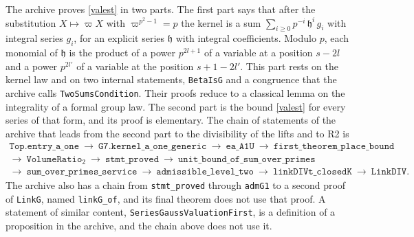 \documentclass[11pt,letterpaper]{article}
\numberwithin{equation}{section}
\begin{document}
The archive proves \eqref{valest} in two parts. The first part says that after the substitution $X\mapsto\varpi X$ with $\varpi^{p^2-1}=p$ the kernel is a sum $\sum_{i\ge0}p^{-i}\,\mathfrak h^i\,g_i$ with integral series $g_i$, for an explicit series $\mathfrak h$ with integral coefficients. Modulo $p$, each monomial of $\mathfrak h$ is the product of a power $p^{2l+1}$ of a variable at a position $s-2l$ and a power $p^{2l'}$ of a variable at the position $s+1-2l'$. This part rests on the kernel law and on two internal statements, \texttt{BetaIsG} and a congruence that the archive calls \texttt{TwoSumsCondition}. Their proofs reduce to a classical lemma on the integrality of a formal group law. The second part is the bound \eqref{valest} for every series of that form, and its proof is elementary. The chain of statements of the archive that leads from the second part to the divisibility of the lifts and to R2 is
\begin{gather*}
\texttt{Top.entry\_a\_one}\ \to\ \texttt{G7.kernel\_a\_one\_generic}\ \to\ \texttt{ea\_A1U}\ \to\ \texttt{first\_theorem\_place\_bound}\\
\to\ \texttt{VolumeRatio}_2\ \to\ \texttt{stmt\_proved}\ \to\ \texttt{unit\_bound\_of\_sum\_over\_primes}\\
\to\ \texttt{sum\_over\_primes\_service}\ \to\ \texttt{admissible\_level\_two}\ \to\ \texttt{linkDIVt\_closedK}\ \to\ \texttt{LinkDIV}.
\end{gather*}
The archive also has a chain from \texttt{stmt\_proved} through \texttt{admG1} to a second proof of \texttt{LinkG}, named \texttt{linkG\_of}, and its final theorem does not use that proof. A statement of similar content, \texttt{SeriesGaussValuationFirst}, is a definition of a proposition in the archive, and the chain above does not use it.
\end{document}

